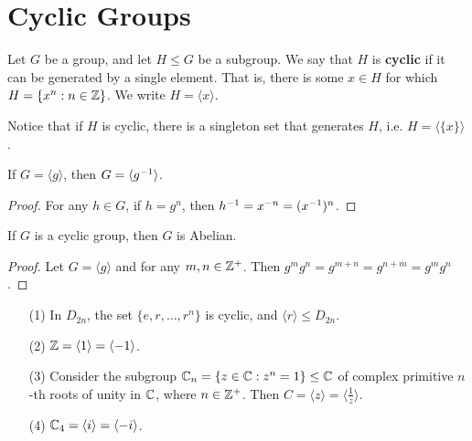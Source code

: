 \section{Cyclic Groups}
\label{section_2.3}

\begin{definition}
  Let $G$ be a group, and let  $H \leq G$ be a subgroup. We say that  $H$ is
  \textbf{cyclic} if it can be generated by a single element. That is, there
  is some $x \in H$ for which  $H=\{x^n : n \in \mathbb{Z}\}$. We write
  $H=\langle x \rangle$.
\end{definition}
\begin{remark}
  Notice that if $H$ is cyclic, there is a singleton set that generates  $H$,
  i.e.  $H=\langle \{x\} \rangle$.
\end{remark}

\begin{lemma}\label{lemma_2.3.1}
  If $G=\langle g \rangle$, then $G=\langle g^{-1} \rangle$.
\end{lemma}
\begin{proof}
  For any $h \in G$, if  $h=g^n$, then $h^{-1}=x^{-n}=(x^{-1})^n$.
\end{proof}

\begin{lemma}\label{lemma_2.3.2}
  If $G$ is a cyclic group, then  $G$ is Abelian.
\end{lemma}
\begin{proof}
  Let $G=\langle g \rangle$ and for any $m,n \in \mathbb{Z}^+$. Then
  $g^mg^n=g^{m+n}=g^{n+m}=g^mg^n$.
\end{proof}

\begin{example}
  \begin{enumerate}
    \item[(1)] In $D_{2n}$, the set $\{e,r, \dots, r^n\}$ is cyclic, and
      $\langle r \rangle \leq D_{2n}$.

    \item[(2)] $\mathbb{Z}= \langle 1 \rangle=\langle -1 \rangle$.

    \item[(3)] Consider the subgroup $\mathbb{C}_n=\{z \in \mathbb{C} : z^n=1\} \leq \mathbb{C}$ of
      complex primitive $n$-th roots of unity in $\mathbb{C}$, where  $n \in
      \mathbb{Z}^+$. Then $C=\langle z \rangle=\langle \frac{1}{z} \rangle$.

    \item[(4)] $\mathbb{C}_4=\langle i \rangle=\langle -i \rangle$.
  \end{enumerate}
\end{example}

